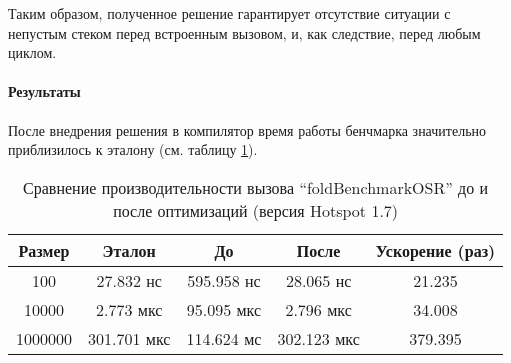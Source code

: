 Таким образом, полученное решение гарантирует отсутствие ситуации с непустым стеком перед встроенным
вызовом, и, как следствие, перед любым циклом.

\paragraph{Результаты}
После внедрения решения в компилятор время работы бенчмарка значительно приблизилось к эталону
(см. таблицу \ref{bm:foldOSR:opt}).

\begin{table}[h]
\begin{center}
\begin{tabular}{|c|c|c|c|c|} \hline
Размер & Эталон & До & После & Ускорение (раз) \\ \hline
100 & 27.832 нс & 595.958 нс & 28.065 нс & 21.235\\ \hline
10000 & 2.773 мкс & 95.095 мкс & 2.796 мкс & 34.008\\ \hline
1000000 & 301.701 мкс & 114.624 мс & 302.123 мкс & 379.395\\ \hline
\end{tabular}
\caption{Сравнение производительности вызова ``foldBenchmarkOSR'' до и после оптимизаций (версия Hotspot 1.7)}
\label{bm:foldOSR:opt}
\end{center}
\end{table}
